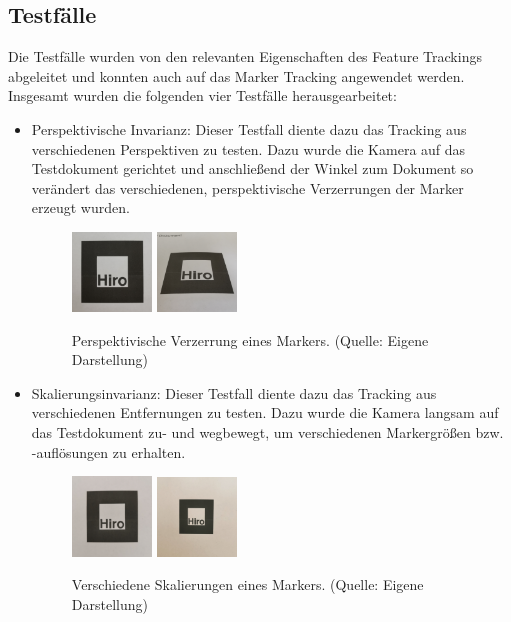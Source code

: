 \subsection{Testfälle}\label{sec:Testfälle}
Die Testfälle wurden von den relevanten Eigenschaften des Feature Trackings abgeleitet und konnten auch auf das Marker Tracking angewendet werden. 
Insgesamt wurden die folgenden vier Testfälle herausgearbeitet:
\begin{itemize}
\item Perspektivische Invarianz: Dieser Testfall diente dazu das Tracking aus verschiedenen Perspektiven zu testen. Dazu wurde die Kamera auf das Testdokument gerichtet und anschließend der Winkel zum Dokument so verändert das verschiedenen, perspektivische Verzerrungen der Marker erzeugt wurden.

\begin{figure}[H]
	\centering
    \includegraphics[width=0.2\textwidth]{Abbildungen/Invarianz/Perspektive1.jpg}
    \includegraphics[width=0.2\textwidth]{Abbildungen/Invarianz/Perspektive2.jpg}
    \caption{Perspektivische Verzerrung eines Markers. (Quelle: Eigene Darstellung)}
\end{figure}

\item Skalierungsinvarianz: Dieser Testfall diente dazu das Tracking aus verschiedenen Entfernungen zu testen. Dazu wurde die Kamera langsam auf das Testdokument zu- und wegbewegt, um verschiedenen Markergrößen bzw. -auflösungen zu erhalten.

\begin{figure}[H]
    \centering
    \includegraphics[width=0.2\textwidth]{Abbildungen/Invarianz/Skalierung1.jpg}
    \includegraphics[width=0.2\textwidth]{Abbildungen/Invarianz/Skalierung2.jpg}
    \caption{Verschiedene Skalierungen eines Markers. (Quelle: Eigene Darstellung)}
\end{figure}


\end{itemize}
